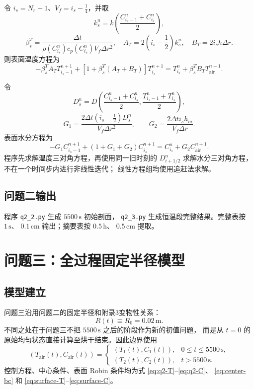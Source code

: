 \documentclass[UTF8,a4paper,11pt]{ctexart}
\numberwithin{equation}{section}
\begin{document}
令 \(i_s=N_r-1\)、\(V_f=i_s-\tfrac14\)，并取
\[
k_s^n=k\left(\frac{C_{i_s-1}^n+C_{i_s}^n}{2}\right),
\]
\[
\beta_s^T=\frac{\Delta t}{\rho(C_{i_s}^n)c_p(C_{i_s}^n)V_f\Delta r^2},
\quad
A_T=2\left(i_s-\frac12\right)k_s^n,\quad
B_T=2i_sh\Delta r.
\]
则表面温度方程为
\begin{equation}
-\beta_s^TA_TT_{i_s-1}^{n+1}
+\left[1+\beta_s^T(A_T+B_T)\right]T_{i_s}^{n+1}
=T_{i_s}^n+\beta_s^TB_TT_{\mathrm{air}}^{n+1}.
\label{eq:q2-T-surface}
\end{equation}

令
\[
D_s^n=D\left(\frac{C_{i_s-1}^n+C_{i_s}^n}{2},
\frac{T_{i_s-1}^n+T_{i_s}^n}{2}\right),
\]
\[
G_1=\frac{2\Delta t(i_s-\frac12)D_s^n}{V_f\Delta r^2},
\qquad
G_2=\frac{2\Delta t i_sh_m}{V_f\Delta r}.
\]
表面水分方程为
\begin{equation}
-G_1C_{i_s-1}^{n+1}
+(1+G_1+G_2)C_{i_s}^{n+1}
=C_{i_s}^n+G_2C_{\mathrm{air}}^{n+1}.
\label{eq:q2-C-surface}
\end{equation}
程序先求解温度三对角方程，再使用同一旧时刻的
\(D_{i+1/2}^n\) 求解水分三对角方程，不在一个时间步内进行非线性迭代；
线性方程组均使用追赶法求解。

\subsection{问题二输出}

程序 \texttt{q2\_2.py} 生成 \(5500\,\mathrm{s}\) 初始剖面，
\texttt{q2\_3.py} 生成恒温段完整结果。完整表按 \(1\,\mathrm{s}\)、
\(0.1\,\mathrm{cm}\) 输出；摘要表按 \(0.5\,\mathrm{h}\)、
\(0.5\,\mathrm{cm}\) 提取。

\section{问题三：全过程固定半径模型}

\subsection{模型建立}

问题三沿用问题二的固定半径和附录3变物性关系：
\[
R(t)\equiv R_0=0.02\,\mathrm{m}.
\]
不同之处在于问题三不把 \(5500\,\mathrm{s}\) 之后的阶段作为新的初值问题，
而是从 \(t=0\) 的原始均匀状态直接计算至烘干结束。因此边界使用
\[
(T_{\mathrm{air}}(t),C_{\mathrm{air}}(t))=
\begin{cases}
(T_1(t),C_1(t)),&0\le t\le5500\,\mathrm{s},\\
(T_2(t),C_2(t)),&t>5500\,\mathrm{s}.
\end{cases}
\]
控制方程、中心条件、表面 Robin 条件均为式
\eqref{eq:q2-T}--\eqref{eq:q2-C}、
\eqref{eq:center-bc} 和
\eqref{eq:surface-T}--\eqref{eq:surface-C}。
\end{document}
